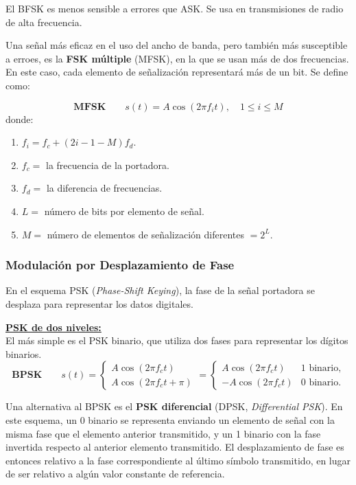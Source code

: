 \documentclass[10pt,a4paper]{article}
\begin{document}
El BFSK es menos sensible a errores que ASK. Se usa en transmisiones de radio de alta frecuencia.

Una señal más eficaz en el uso del ancho de banda, pero también más susceptible a erroes, es la \textbf{FSK múltiple} (MFSK), en la que se usan más de dos frecuencias. En este caso, cada elemento de señalización representará más de un bit. Se define como:

\[\mathbf{MFSK} \qquad
 s(t) =  A \cos(2\pi f_i t), \quad 1\leq i \leq M
\]
donde:
\begin{enumerate}[ ]
\item $f_i=f_c+(2i - 1 -M)f_d$.
\item $f_c=$ la frecuencia de la portadora.
\item $f_d=$ la diferencia de frecuencias.
\item $L=$ número de bits por elemento de señal.
\item $M=$ número de elementos de señalización diferentes $=2^L$.
\end{enumerate}

\subsubsection{Modulación por Desplazamiento de Fase}
En el esquema PSK (\textit{Phase-Shift Keying}), la fase de la señal portadora se desplaza para representar los datos digitales.

\underline{\textbf{PSK de dos niveles:}}\\
El más simple es el PSK binario, que utiliza dos fases para representar los dígitos binarios.
\[\mathbf{BPSK} \qquad
 s(t) = \begin{cases}
        A \cos(2\pi f_c t) \\
        A \cos(2\pi f_c t + \pi) 
        \end{cases}
      = \begin{cases}
        A \cos(2\pi f_c t)  & \text{1 binario,}\\
        - A \cos(2\pi f_c t) & \text{0 binario.}
        \end{cases}
\]

Una alternativa al BPSK es el \textbf{PSK diferencial} (DPSK, \textit{Differential PSK}). En este esquema, un 0 binario se representa enviando un elemento de señal con la misma fase que el elemento anterior transmitido, y un 1 binario con la fase invertida respecto al anterior elemento transmitido. El desplazamiento de fase es entonces relativo a la fase correspondiente al último símbolo transmitido, en lugar de ser relativo a algún valor constante de referencia.
\end{document}
